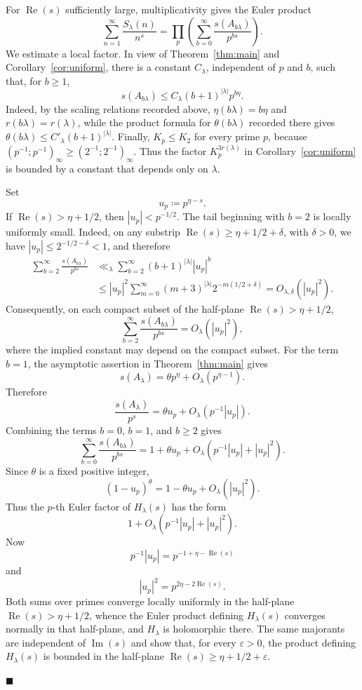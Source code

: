 \documentclass[a4paper,11pt,reqno]{amsart}
\theoremstyle{plain}
\theoremstyle{remark}
\numberwithin{equation}{section}
\renewcommand{\leq}{\leqslant}
\renewcommand{\geq}{\geqslant}
\newenvironment{proofof}{{\bf Proof. }}{\hfill $\blacksquare$ \\}
\begin{document}
\begin{proofof}
For $\operatorname{Re}(s)$ sufficiently large, multiplicativity gives the
Euler product
\[
        \sum_{n=1}^{\infty}\frac{S_\lambda(n)}{n^s}
        =
        \prod_p
        \left(\sum_{b=0}^{\infty}\frac{s(A_{b\lambda})}{p^{bs}}\right).
\]
We estimate a local factor. In view of Theorem~\ref{thm:main} and
Corollary~\ref{cor:uniform}, there is a constant $C_\lambda$, independent of
$p$ and $b$, such that, for $b\geq 1$,
\[
        s(A_{b\lambda})
        \leq
        C_\lambda (b+1)^{|\lambda|}p^{b\eta}.
\]
Indeed, by the scaling relations recorded above, $\eta(b\lambda)=b\eta$ and
$r(b\lambda)=r(\lambda)$, while the product formula for $\theta(b\lambda)$
recorded there gives $\theta(b\lambda)\leq C'_\lambda(b+1)^{|\lambda|}$.
Finally, $K_p\leq K_2$ for every prime $p$, because
$(p^{-1};p^{-1})_\infty\geq (2^{-1};2^{-1})_\infty$. Thus the factor
$K_p^{3r(\lambda)}$ in Corollary~\ref{cor:uniform} is bounded by a constant
that depends only on $\lambda$.

Set
\[
        u_p\coloneqq p^{\eta-s}.
\]
If $\operatorname{Re}(s)>\eta+1/2$, then $|u_p|<p^{-1/2}$. The tail beginning
with $b=2$ is locally uniformly small. Indeed, on any substrip
$\operatorname{Re}(s)\geq \eta+1/2+\delta$, with $\delta>0$, we have
$|u_p|\leq 2^{-1/2-\delta}<1$, and therefore
\[
\begin{aligned}
        \sum_{b=2}^{\infty}\frac{s(A_{b\lambda})}{p^{bs}}
        &\ll_\lambda
        \sum_{b=2}^{\infty}(b+1)^{|\lambda|}|u_p|^b                 \\
        &\leq
        |u_p|^2\sum_{m=0}^{\infty}(m+3)^{|\lambda|}2^{-m(1/2+\delta)}
        =O_{\lambda,\delta}(|u_p|^2).
\end{aligned}
\]
Consequently, on each compact subset of the half-plane
$\operatorname{Re}(s)>\eta+1/2$,
\[
        \sum_{b=2}^{\infty}\frac{s(A_{b\lambda})}{p^{bs}}
        =
        O_\lambda(|u_p|^2),
\]
where the implied constant may depend on the compact subset.
For the term $b=1$, the asymptotic assertion in Theorem~\ref{thm:main} gives
\[
        s(A_\lambda)=\theta p^\eta+O_\lambda(p^{\eta-1}).
\]
Therefore
\[
        \frac{s(A_\lambda)}{p^s}
        =
        \theta u_p+O_\lambda(p^{-1}|u_p|).
\]
Combining the terms $b=0$, $b=1$, and $b\geq 2$ gives
\[
        \sum_{b=0}^{\infty}\frac{s(A_{b\lambda})}{p^{bs}}
        =
        1+\theta u_p+O_\lambda(p^{-1}|u_p|+|u_p|^2).
\]
Since $\theta$ is a fixed positive integer,
\[
        (1-u_p)^\theta
        =
        1-\theta u_p+O_\lambda(|u_p|^2).
\]
Thus the $p$-th Euler factor of $H_\lambda(s)$ has the form
\[
        1+O_\lambda(p^{-1}|u_p|+|u_p|^2).
\]
Now
\[
        p^{-1}|u_p|=p^{-1+\eta-\operatorname{Re}(s)}
\]
and
\[
        |u_p|^2=p^{2\eta-2\operatorname{Re}(s)}.
\]
Both sums over primes converge locally uniformly in the half-plane
$\operatorname{Re}(s)>\eta+1/2$, whence the Euler product defining
$H_\lambda(s)$ converges normally in that half-plane, and $H_\lambda$ is
holomorphic there. The same majorants are independent of
$\operatorname{Im}(s)$ and show that, for every $\varepsilon>0$, the product
defining $H_\lambda(s)$ is bounded in the half-plane
$\operatorname{Re}(s)\geq \eta+1/2+\varepsilon$.


\end{proofof}
\end{document}
